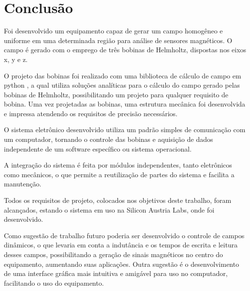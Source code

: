 \chapter{Conclusão}

Foi desenvolvido um equipamento capaz de gerar um campo homogêneo e uniforme em uma determinada região para análise de sensores magnéticos. O campo é gerado com o emprego de três bobinas de Helmholtz, dispostas nos eixos x, y e z.

O projeto das bobinas foi realizado com uma biblioteca de cálculo de campo em python \cite{magpy2020}, a qual utiliza soluções analíticas para o cálculo do campo gerado pelas bobinas de Helmholtz, possibilitando um projeto para qualquer requisito de bobina. Uma vez projetadas as bobinas, uma estrutura mecânica foi desenvolvida e impressa atendendo os requisitos de precisão necessários.

O sistema eletrônico desenvolvido utiliza um padrão simples de comunicação com um computador, tornando o controle das bobinas e aquisição de dados independente de um software específico ou sistema operacional.

A integração do sistema é feita por módulos independentes, tanto eletrônicos como mecânicos, o que permite a reutilização de partes do sistema e facilita a manutenção.

Todos os requisitos de projeto, colocados nos objetivos deste trabalho, foram alcançados, estando o sistema em uso na Silicon Austria Labs, onde foi desenvolvido.

Como sugestão de trabalho futuro poderia ser desenvolvido o controle de campos dinâmicos, o que levaria em conta a indutância e os tempos de escrita e leitura desses campos, possibilitando a geração de sinais magnéticos no centro do equipamento, aumentando suas aplicações.  Outra sugestão é o desenvolvimento de uma interface gráfica mais intuitiva e amigável para uso no computador, facilitando o uso do equipamento.